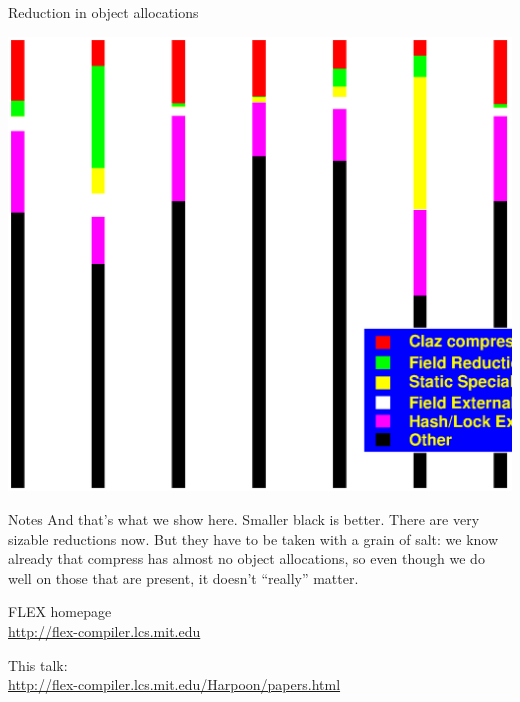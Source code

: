 \documentclass[%
pdf,
colorBG,
slideColor,
nototal,
oqe
]{prosper}
\renewcommand{\yellow}{\colC}
\newenvironment{talknotes}{\begin{slide}{Notes}\tiny}{\end{slide}}
\begin{document}
\begin{slide}{Reduction in object allocations}
\begin{center}
\includegraphics[scale=0.45]{Figures/oopsla-objalloc-color.eps}
\end{center}
\end{slide}

\begin{talknotes}
And that's what we show here.  Smaller black is better.
There are very sizable reductions now.
But they have to be taken with a grain of salt: we know already that
compress has almost no object allocations, so even though we do well
on those that are present, it doesn't ``really'' matter.
\end{talknotes}

\begin{slide}{}
\vspace{.5cm}
\begin{center}\end{center}

\vspace{1.2cm}
\begin{center}
FLEX homepage
\\
{\yellow
\href{http://flex-compiler.lcs.mit.edu}{http://flex-compiler.lcs.mit.edu}
}

\vspace{1cm}
This talk:
\\
{\yellow
\href{http://flex-compiler.lcs.mit.edu/Harpoon/papers.html}{http://flex-compiler.lcs.mit.edu/Harpoon/papers.html}
}
\end{center}
\end{slide}
\end{document}
